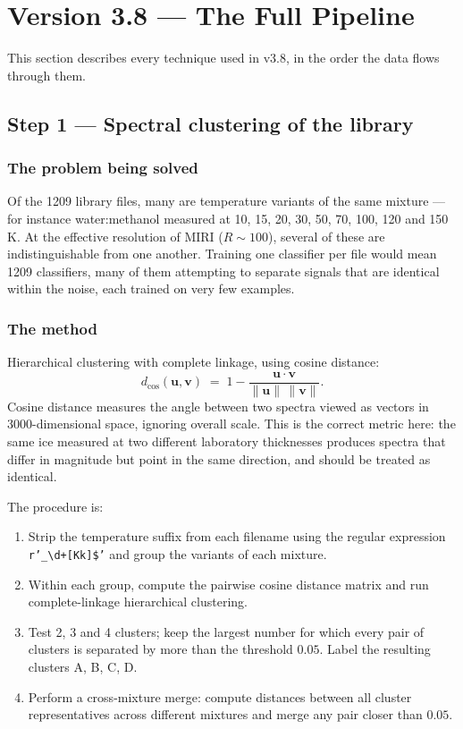 \documentclass[11pt,a4paper]{article}
\newcommand{\code}[1]{\texttt{\small #1}}
\begin{document}
\section{Version 3.8 --- The Full Pipeline}

This section describes every technique used in v3.8, in the order the data
flows through them.

\subsection{Step 1 --- Spectral clustering of the library}

\subsubsection*{The problem being solved}

Of the 1209 library files, many are temperature variants of the same
mixture --- for instance water:methanol measured at 10, 15, 20, 30, 50,
70, 100, 120 and 150\,K. At the effective resolution of MIRI ($R\sim100$),
several of these are indistinguishable from one another. Training one
classifier per file would mean 1209 classifiers, many of them attempting to
separate signals that are identical within the noise, each trained on very
few examples.

\subsubsection*{The method}

Hierarchical clustering with complete linkage, using cosine distance:
\[
  d_{\cos}(\mathbf{u},\mathbf{v}) \;=\;
  1 - \frac{\mathbf{u}\cdot\mathbf{v}}{\|\mathbf{u}\|\,\|\mathbf{v}\|}.
\]
Cosine distance measures the angle between two spectra viewed as vectors in
3000-dimensional space, ignoring overall scale. This is the correct metric
here: the same ice measured at two different laboratory thicknesses
produces spectra that differ in magnitude but point in the same direction,
and should be treated as identical.

The procedure is:

\begin{enumerate}
  \item Strip the temperature suffix from each filename using the regular
        expression \code{r'\_\textbackslash d+[Kk]\$'} and group the
        variants of each mixture.
  \item Within each group, compute the pairwise cosine distance matrix and
        run complete-linkage hierarchical clustering.
  \item Test 2, 3 and 4 clusters; keep the largest number for which every
        pair of clusters is separated by more than the threshold
        $0.05$. Label the resulting clusters A, B, C, D.
  \item Perform a cross-mixture merge: compute distances between all
        cluster representatives across different mixtures and merge any
        pair closer than $0.05$.
\end{enumerate}
\end{document}
